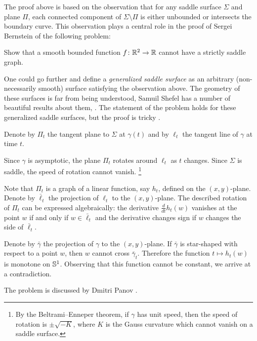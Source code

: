 The proof above is based on the observation 
that for any saddle surface $\Sigma$ and plane $\Pi$,
each connected component of $\Sigma\setminus \Pi$ is either unbounded or intersects the boundary curve.
This observation plays a central role in the proof of Sergei Bernstein \cite{bernshtein}
of the following problem:

\begin{pr}
Show that a smooth bounded function $f\colon\mathbb{R}^2\to\mathbb{R}$ cannot have a strictly saddle graph.
\end{pr}

One could go further and define a \emph{generalized saddle surface} as an arbitrary (non-necessarily smooth) surface satisfying the observation above.
The geometry of these surfaces is far from being understood,
Samuil Shefel has a number of beautiful results about them, 
\cite[see][and the references therein]{shefel, AKP-invitation}.
The statement of the problem holds for these generalized saddle surfaces, but
the proof is tricky \cite{petrunin-stadler}.


Denote by $\Pi_t$ the tangent plane to $\Sigma$ at $\gamma(t)$ and by $\ell_t$ the tangent line of $\gamma$ at time $t$.

Since $\gamma$ is asymptotic, the plane $\Pi_t$ rotates around $\ell_t$ as $t$ changes.
Since $\Sigma$ is saddle, the speed of rotation cannot vanish.%
\footnote{By the Beltrami--Enneper theorem, if $\gamma$ has unit speed, then the speed of rotation is $\pm\sqrt{-K}$, where $K$ is the Gauss curvature which cannot vanish on a saddle surface.}

Note that $\Pi_t$ is a graph of a linear function, say $h_t$, defined on the $(x, y)$-plane.
Denote by $\bar\ell_t$ the projection of $\ell_t$ to the $(x, y)$-plane.
The described rotation of $\Pi_t$ can be expressed algebraically:
the derivative $\tfrac{d}{dt}h_t(w)$ vanishes at the point $w$ if and only if $w\in \bar\ell_t$ 
and the derivative changes sign if $w$ changes the side of $\bar\ell_t$.

Denote by $\bar\gamma$ the projection of $\gamma$ to the $(x, y)$-plane.
If $\bar\gamma$ is star-shaped with respect to a point $w$, then $w$ cannot cross $\bar\gamma_t$.
Therefore the function $t\mapsto h_t(w)$ is monotone on $\mathbb{S}^1$.
Observing that this function cannot be constant, we arrive at a contradiction.\qeds

The problem is discussed by Dmitri Panov \cite{panov-curves}.

